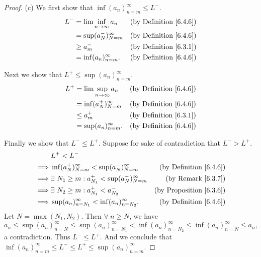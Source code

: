 \begin{proof}{(c)}
    We first show that \(\inf(a_n)_{n = m}^\infty \leq L^-\).
    \begin{align*}
        L^- & = \lim\inf_{n \to \infty} a_n & \text{(by Definition \ref{6.4.6})} \\
            & = \sup(a_N^-)_{N = m}^\infty  & \text{(by Definition \ref{6.4.6})} \\
            & \geq a_m^-                    & \text{(by Definition \ref{6.3.1})} \\
            & = \inf(a_n)_{n = m}^\infty.   & \text{(by Definition \ref{6.4.6})}
    \end{align*}

    Next we show that \(L^+ \leq \sup(a_n)_{n = m}^\infty\).
    \begin{align*}
        L^+ & = \lim\sup_{n \to \infty} a_n & \text{(by Definition \ref{6.4.6})} \\
            & = \inf(a_N^+)_{N = m}^\infty  & \text{(by Definition \ref{6.4.6})} \\
            & \leq a_m^+                    & \text{(by Definition \ref{6.3.1})} \\
            & = \sup(a_n)_{n = m}^\infty.   & \text{(by Definition \ref{6.4.6})}
    \end{align*}

    Finally we show that \(L^- \leq L^+\).
    Suppose for sake of contradiction that \(L^- > L^+\).
    \begin{align*}
                 & L^+ < L^-                                                                                          \\
        \implies & \inf(a_N^+)_{N = m}^\infty < \sup(a_N^-)_{N = m}^\infty      & \text{(by Definition \ref{6.4.6})}  \\
        \implies & \exists\ N_1 \geq m : a_{N_1}^+ < \sup(a_N^-)_{N = m}^\infty & \text{(by Remark \ref{6.3.7})}      \\
        \implies & \exists\ N_2 \geq m : a_{N_1}^+ < a_{N_2}^-                  & \text{(by Proposition \ref{6.3.6})} \\
        \implies & \sup(a_n)_{n = N_1}^\infty < \inf(a_n)_{n = N_2}^\infty.     & \text{(by Definition \ref{6.4.6})}
    \end{align*}
    Let \(N = \max(N_1, N_2)\).
    Then \(\forall\ n \geq N\), we have
    \[
        a_n \leq \sup(a_n)_{n = N}^\infty \leq \sup(a_n)_{n = N_1}^\infty < \inf(a_n)_{n = N_2}^\infty \leq \inf(a_n)_{n = N}^\infty \leq a_n,
    \]
    a contradiction.
    Thus \(L^- \leq L^+\).
    And we conclude that \(\inf(a_n)_{n = m}^\infty \leq L^- \leq L^+ \leq \sup(a_n)_{n = m}^\infty\).
\end{proof}

